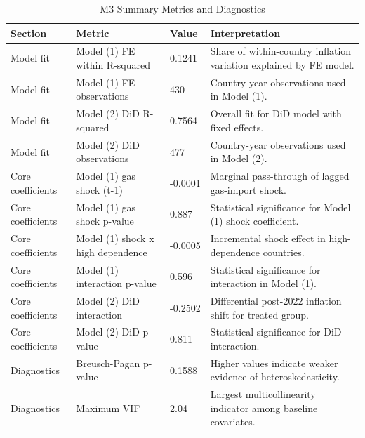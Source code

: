 \begin{table}
\caption{M3 Summary Metrics and Diagnostics}
\label{tab:m3_summary_metrics}
\begin{tabular}{lp{5.6cm}lp{6.2cm}}
\toprule
Section & Metric & Value & Interpretation \\
\midrule
Model fit & Model (1) FE within R-squared & 0.1241 & Share of within-country inflation variation explained by FE model. \\
Model fit & Model (1) FE observations & 430 & Country-year observations used in Model (1). \\
Model fit & Model (2) DiD R-squared & 0.7564 & Overall fit for DiD model with fixed effects. \\
Model fit & Model (2) DiD observations & 477 & Country-year observations used in Model (2). \\
Core coefficients & Model (1) gas shock (t-1) & -0.0001 & Marginal pass-through of lagged gas-import shock. \\
Core coefficients & Model (1) gas shock p-value & 0.887 & Statistical significance for Model (1) shock coefficient. \\
Core coefficients & Model (1) shock x high dependence & -0.0005 & Incremental shock effect in high-dependence countries. \\
Core coefficients & Model (1) interaction p-value & 0.596 & Statistical significance for interaction in Model (1). \\
Core coefficients & Model (2) DiD interaction & -0.2502 & Differential post-2022 inflation shift for treated group. \\
Core coefficients & Model (2) DiD p-value & 0.811 & Statistical significance for DiD interaction. \\
Diagnostics & Breusch-Pagan p-value & 0.1588 & Higher values indicate weaker evidence of heteroskedasticity. \\
Diagnostics & Maximum VIF & 2.04 & Largest multicollinearity indicator among baseline covariates. \\
\bottomrule
\end{tabular}
\end{table}
